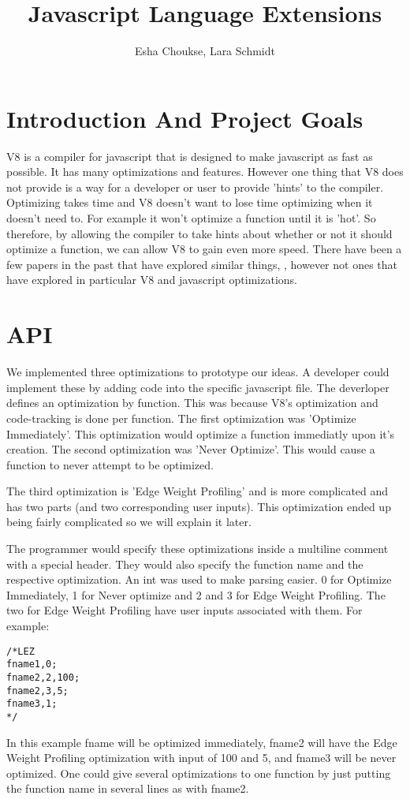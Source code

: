 \documentclass[twocolumn,showpacs,%
  nofootinbib,aps,superscriptaddress,%
  eqsecnum,prd,notitlepage,showkeys,10pt]{revtex4-1}
\begin{document}
\title{Javascript Language Extensions}
\author{Esha Choukse, Lara Schmidt}


\maketitle

\section{Introduction And Project Goals} 
V8 is a compiler for javascript that is designed to make javascript as fast as possible. It has many optimizations and features. However one thing that V8 does not provide is a way for a developer or user to provide 'hints' to the compiler. Optimizing takes time and V8 doesn't want to lose time optimizing when it doesn't need to. For example it won't optimize a function until it is 'hot'. So therefore, by allowing the compiler to take hints about whether or not it should optimize a function, we can allow V8 to gain even more speed. There have been a few papers in the past that have explored similar things, \cite{}, however not ones that have explored in particular V8 and javascript optimizations.

\section{API}
We implemented three optimizations to prototype our ideas. A developer could implement these by adding code into the specific javascript file. The deverloper defines an optimization by function. This was because V8's optimization and code-tracking is done per function. The first optimization was 'Optimize Immediately'. This optimization would optimize a function immediatly upon it's creation. The second optimization was 'Never Optimize'. This would cause a function to never attempt to be optimized. 

The third optimization is 'Edge Weight Profiling' and is more complicated and has two parts (and two corresponding user inputs). This optimization ended up being fairly complicated so we will explain it later.

The programmer would specify these optimizations inside a multiline comment with a special header. They would also specify the function name and the respective optimization. An int was used to make parsing easier. 0 for Optimize Immediately, 1 for Never optimize and 2 and 3 for Edge Weight Profiling. The two for Edge Weight Profiling have user inputs associated with them. For example:
\begin{lstlisting}
/*LEZ
fname1,0;
fname2,2,100;
fname2,3,5;
fname3,1;
*/
\end{lstlisting}
In this example fname will be optimized immediately, fname2 will have the Edge Weight Profiling optimization with input of 100 and 5, and fname3 will be never optimized. One could give several optimizations to one function by just putting the function name in several lines as with fname2.
\end{document}
